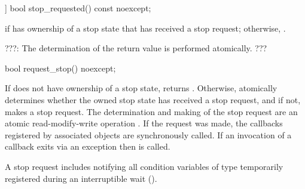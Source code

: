 {%
\begin{itemdecl}
[[nodiscard]] bool stop_requested() const noexcept;
\end{itemdecl}
\begin{itemdescr}
  \pnum\returns {} if  has ownership of a stop state that has received a stop request;
                otherwise, .
                
                {\color{blue} ???:}
                The determination of the return value is performed atomically.
                {\color{blue} ???}
\end{itemdescr}

%
\begin{itemdecl}
bool request_stop() noexcept;
\end{itemdecl}
\begin{itemdescr}

  \pnum\effects If  does not have ownership of a stop state, returns . 
                Otherwise, atomically determines whether the owned stop state has received a stop request,
                and if not, makes a stop request.
                The determination and making of the stop request are an
                atomic read-modify-write operation .
                If the request was made, the callbacks registered by associated 
                objects are synchronously called.
                If an invocation of a callback exits via an exception 
                then  is called.
                \begin{note} A stop request includes notifying all condition variables
                             of type 
                             temporarily registered during an interruptible wait ().
                             \end{note}


\end{itemdescr}}
